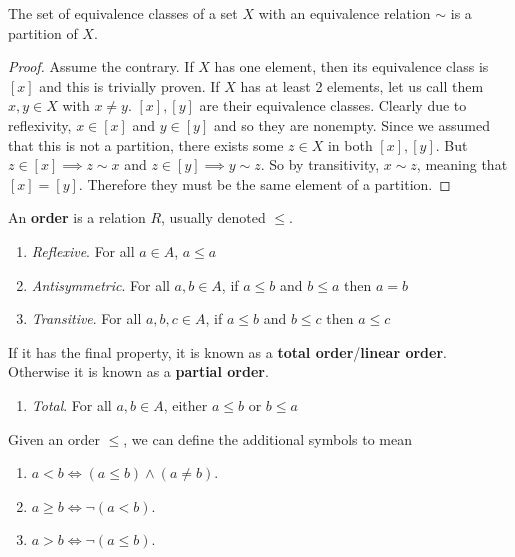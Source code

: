 \documentclass{article}
\begin{document}
    \begin{theorem}[]
      The set of equivalence classes of a set $X$ with an equivalence relation $\sim$ is a partition of $X$. 
    \end{theorem} 
    \begin{proof}
      Assume the contrary. If $X$ has one element, then its equivalence class is $[x]$ and this is trivially proven. If $X$ has at least 2 elements, let us call them $x, y \in X$ with $x \neq y$. $[x], [y]$ are their equivalence classes. Clearly due to reflexivity, $x \in [x]$ and $y \in [y]$ and so they are nonempty. Since we assumed that this is not a partition, there exists some $z \in X$ in both $[x], [y]$. But $z \in [x] \implies z \sim x$ and $z \in [y] \implies y \sim z$. So by transitivity, $x \sim z$, meaning that $[x] = [y]$. Therefore they must be the same element of a partition. 
    \end{proof}

    \begin{definition}[Order]
      An \textbf{order} is a relation $R$, usually denoted $\leq$. 
      \begin{enumerate}
        \item \textit{Reflexive}. For all $a \in A$, $a \leq a$
        \item \textit{Antisymmetric}. For all $a,b \in A$, if $a \leq b$ and $b \leq a$ then $a=b$
        \item \textit{Transitive}. For all $a,b,c \in A$, if $a \leq b$ and $b \leq c$ then $a \leq c$
      \end{enumerate} 
      If it has the final property, it is known as a \textbf{total order}/\textbf{linear order}. Otherwise it is known as a \textbf{partial order}. 
      \begin{enumerate}
        \item \textit{Total}. For all $a,b \in A$, either $a \leq b$ or $b \leq a$
      \end{enumerate} 
      Given an order $\leq$, we can define the additional symbols to mean 
      \begin{enumerate}
        \item $a < b \iff (a \leq b) \land (a \neq b)$. 
        \item $a \geq b \iff \neg(a < b)$. 
        \item $a > b \iff \neg(a \leq b)$. 
      \end{enumerate} 
    \end{definition} 
\end{document}
